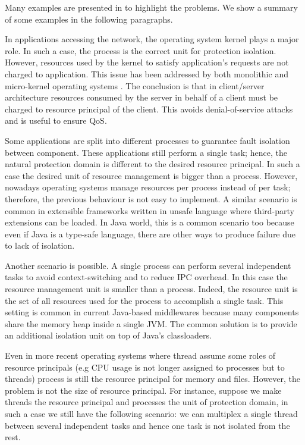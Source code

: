 Many examples are presented in \cite{Banga:1999:RCN:296806.296810} to highlight the problems.
We show a summary of some examples in the following paragraphs.

In applications accessing the network, the operating system kernel plays a major role.
In such a case, the process is the correct unit for protection isolation.
However, resources used by the kernel to satisfy application's requests are not charged to application.
This issue has been addressed by both monolithic and micro-kernel operating systems \cite{Bao:2008:HPI:1384529.1375484}.
The conclusion is that in client/server architecture resources consumed by the server in behalf of a client must be charged to resource principal of the client.
This avoids denial-of-service attacks and is useful to ensure QoS.

Some applications are split into different processes to guarantee fault isolation between component.
These applications still perform a single task; hence, the natural protection domain is different to the desired resource principal.
In such a case the desired unit of resource management is bigger than a process.
However, nowadays operating systems manage resources per process instead of per task; therefore, the previous behaviour is not easy to implement.
A similar scenario is common in extensible frameworks written in unsafe language where third-party extensions can be loaded.
In Java world, this is a common scenario too because even if Java is a type-safe language, there are other ways to produce failure due to lack of isolation.

Another scenario is possible.
A single process can perform several independent tasks to avoid context-switching and to reduce IPC overhead.
In this case the resource management unit is smaller than a process.
Indeed, the resource unit is the set of all resources used for the process to accomplish a single task.
This setting is common in current Java-based middlewares because many components share the memory heap inside a single JVM.
The common solution is to provide an additional isolation unit on top of Java's classloaders.

Even in more recent operating systems where thread assume some roles of resource principals (e.g CPU usage is not longer assigned to processes but to threads) process is still the resource principal for memory and files.
However, the problem is not the size of resource principal.
For instance, suppose we make threads the resource principal and processes the unit of protection domain, in such a case we still have the following scenario: we can multiplex a single thread between several independent tasks and hence one task is not isolated from the rest.


